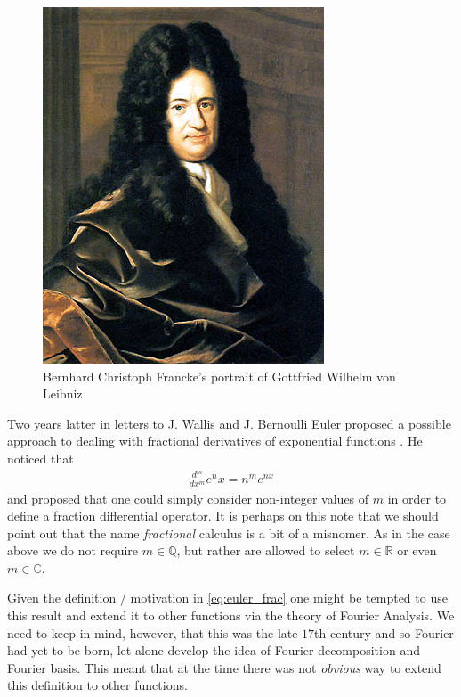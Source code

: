\begin{figure}
    \includegraphics[scale=0.4]{images/Gottfried_Wilhelm_von_Leibniz}
    \caption{Bernhard Christoph Francke's portrait of Gottfried Wilhelm von Leibniz}
\end{figure}

Two years latter in letters to J. Wallis and J. Bernoulli Euler proposed a possible approach to dealing with fractional derivatives of exponential functions \cite{Abbas2012}. He noticed that
\begin{align}
    \label{eq:euler_frac}
    \frac{d^m}{dx^m} e^nx = n^me^{nx} 
\end{align}
and proposed that one could simply consider non-integer values of $ m $ in order to define a fraction differential operator. 
It is perhaps on this note that we should point out that the name \emph{fractional} calculus is a bit of a misnomer. As in the case above we do not require $ m \in \mathbb{Q} $, but rather are allowed to select $ m \in \mathbb{R} $ or even $ m \in \mathbb{C} $.

Given the definition / motivation in \eqref{eq:euler_frac} one might be tempted to use this result and extend it to other functions via the theory of Fourier Analysis. We need to keep in mind, however, that this was the late $ 17$th century and so Fourier had yet to be born, let alone develop the idea of Fourier decomposition and Fourier basis. This meant that at the time there was not \emph{obvious} way to extend this definition to other functions.

